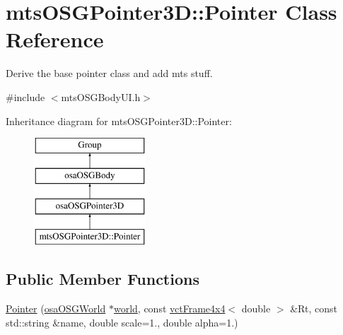 \hypertarget{classmts_o_s_g_pointer3_d_1_1_pointer}{}\section{mts\+O\+S\+G\+Pointer3\+D\+:\+:Pointer Class Reference}
\label{classmts_o_s_g_pointer3_d_1_1_pointer}


Derive the base pointer class and add mts stuff.  




{\ttfamily \#include $<$mts\+O\+S\+G\+Body\+U\+I.\+h$>$}

Inheritance diagram for mts\+O\+S\+G\+Pointer3\+D\+:\+:Pointer\+:\begin{figure}[H]
\begin{center}
\leavevmode
\includegraphics[height=4.000000cm]{df/db7/classmts_o_s_g_pointer3_d_1_1_pointer}
\end{center}
\end{figure}
\subsection*{Public Member Functions}
\begin{DoxyCompactItemize}
\item 
\hyperlink{classmts_o_s_g_pointer3_d_1_1_pointer_a541955da4a053da2e46f6dbf04a83e00}{Pointer} (\hyperlink{classosa_o_s_g_world}{osa\+O\+S\+G\+World} $\ast$\hyperlink{classosa_o_s_g_pointer3_d_a6576d36096a1c3a9127fbf9dbafee677}{world}, const \hyperlink{classvct_frame4x4}{vct\+Frame4x4}$<$ double $>$ \&Rt, const std\+::string \&name, double scale=1., double alpha=1.)
\end{DoxyCompactItemize}
